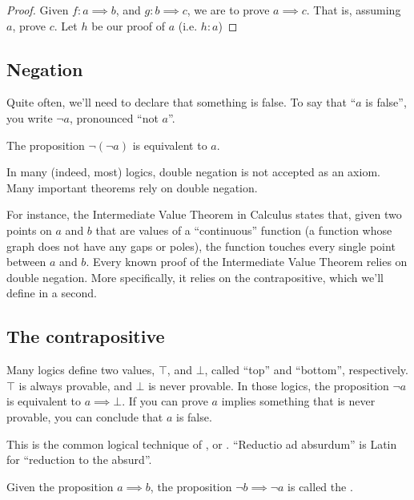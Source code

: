\begin{proof}
  Given $f : a \implies b$, and $g : b \implies c$, we are to prove $a
  \implies c$. That is, assuming $a$, prove $c$. Let $h$ be our proof
  of $a$ (i.e. $h : a$)
\end{proof}

\subsection{Negation}

Quite often, we'll need to declare that something is false. To say
that ``$a$ is false'', you write $\lnot a$, pronounced ``not $a$''.

\begin{axiom}
  The proposition $\lnot(\lnot a)$ is equivalent to $a$.
\end{axiom}

\begin{remark}
  In many (indeed, most) logics, double negation is not accepted as an
  axiom. Many important theorems rely on double negation.

  For instance, the Intermediate Value Theorem in Calculus states
  that, given two points on $a$ and $b$ that are values of a
  ``continuous'' function (a function whose graph does not have any
  gaps or poles), the function touches every single point between $a$
  and $b$. Every known proof of the Intermediate Value Theorem relies
  on double negation. More specifically, it relies on the
  contrapositive, which we'll define in a second.
\end{remark}

\subsection{The contrapositive}

Many logics define two values, $\top$, and $\bot$, called ``top'' and
``bottom'', respectively. $\top$ is always provable, and $\bot$ is
never provable. In those logics, the proposition $\lnot a$ is
equivalent to $a \implies \bot$. If you can prove $a$ implies
something that is never provable, you can conclude that $a$ is false.

This is the common logical technique of ,
or . ``Reductio ad absurdum'' is Latin
for ``reduction to the absurd''.

\begin{definition}
  Given the proposition $a \implies b$, the proposition
  $\lnot b \implies \lnot a$ is called the .
\end{definition}

